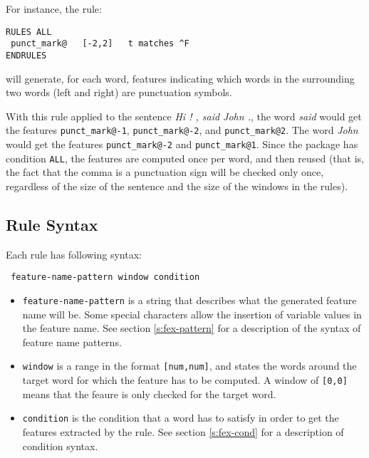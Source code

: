 \documentclass[a4paper]{book}
\begin{document}
\noindent For instance, the rule:
\begin{verbatim} 
RULES ALL
 punct_mark@   [-2,2]   t matches ^F
ENDRULES
\end{verbatim} 
 \noindent will generate, for each word, features indicating which words in 
  the surrounding two words (left and right) are punctuation symbols.

  With this rule applied to the sentence \textit{Hi ! , said John .},
  the word \textit{said} would get the features
  \texttt{punct\_mark@-1}, \texttt{punct\_mark@-2}, and
  \texttt{punct\_mark@2}. The word \textit{John} would get the
  features \texttt{punct\_mark@-2} and \texttt{punct\_mark@1}.  Since
  the package has condition \texttt{ALL}, the features are computed
  once per word, and then reused (that is, the fact that the comma is a 
  punctuation sign will be checked only once, regardless of the size of the 
  sentence and the size of the windows in the rules).

 \subsection{Rule Syntax}
\label{s:fex-rules}

  Each rule has following syntax:
\begin{verbatim}
 feature-name-pattern window condition
\end{verbatim}

 \begin{itemize} 
   \item \verb#feature-name-pattern# is a string that describes what
     the generated feature name will be.  Some special characters
     allow the insertion of variable values in the feature name. See
     section \ref{s:fex-pattern} for a description of the syntax of
     feature name patterns.

   \item \verb#window# is a range in the format \verb#[num,num]#, and
     states the words around the target word for which the feature has
     to be computed.  A window of \verb#[0,0]# means that the feaure
     is only checked for the target word.

   \item \verb#condition# is the condition that a word has to satisfy
     in order to get the features extracted by the rule. See section
     \ref{s:fex-cond} for a description of condition syntax.

 \end{itemize}
\end{document}
